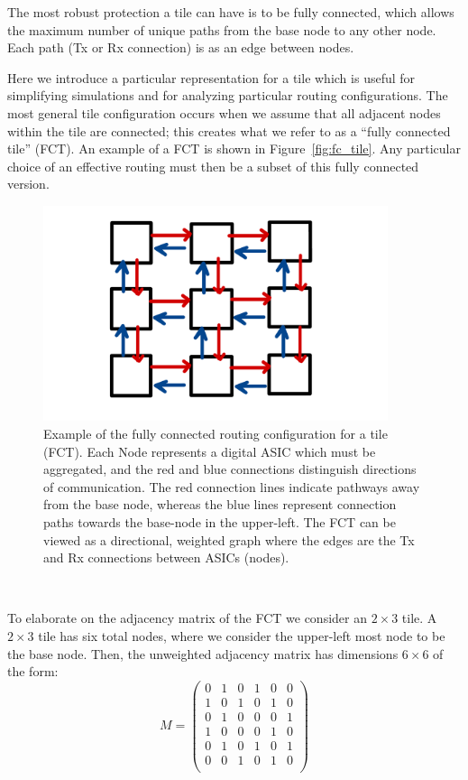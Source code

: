The most robust protection a tile can have is to be fully connected, which allows the maximum number of unique paths from the base node to any other node.
Each path (Tx or Rx connection) is as an edge between nodes.

Here we introduce a particular representation for a tile which is useful for simplifying simulations and for analyzing particular routing configurations.
The most general tile configuration occurs when we assume that all adjacent nodes within the tile are connected; this creates what we refer to as a ``fully connected tile'' (FCT).
An example of a FCT is shown in Figure~\ref{fig:fc_tile}.
Any particular choice of an effective routing must then be a subset of this fully connected version.

\begin{figure}[]
\centering
\includegraphics[width=0.9\textwidth]{images/Broadcast.pdf}
\caption{Example of the fully connected routing configuration for a tile (FCT).
Each Node represents a digital ASIC which must be aggregated, and the red and blue connections distinguish directions of communication.
The red connection lines indicate pathways away from the base node, whereas the blue lines represent connection paths towards the base-node in the upper-left.
The FCT can be viewed as a directional, weighted graph where the edges are the Tx and Rx connections between ASICs (nodes).
}
\end{figure}~\label{fig:fc_tile}

To elaborate on the adjacency matrix of the FCT we consider an $2\times 3$ tile.
A $2\times 3$ tile has six total nodes, where we consider the upper-left most node to be the base node.
Then, the unweighted adjacency matrix has dimensions $6\times6$ of the form:
\begin{equation}
M =
 \begin{pmatrix}
 0 & 1 & 0 & 1 & 0 & 0 \\
 1 & 0 & 1 & 0 & 1 & 0 \\
 0 & 1 & 0 & 0 & 0 & 1 \\
 1 & 0 & 0 & 0 & 1 & 0 \\
 0 & 1 & 0 & 1 & 0 & 1 \\
 0 & 0 & 1 & 0 & 1 & 0 \\
 \end{pmatrix}
\end{equation}~\label{eq:adjacency_matr}

